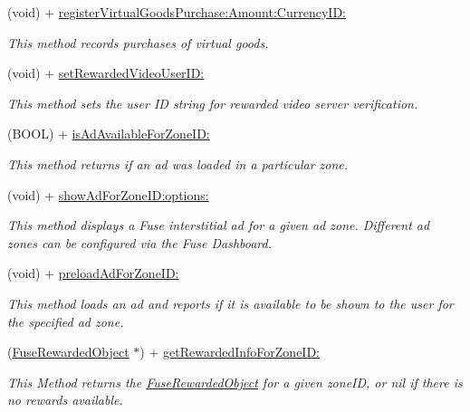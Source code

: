 \begin{DoxyCompactItemize}
(void) + \hyperlink{interface_fuse_s_d_k_abd1bc1b2e677978fb0e559cd9f7a72a9}{register\+Virtual\+Goods\+Purchase\+:\+Amount\+:\+Currency\+I\+D\+:}
\begin{DoxyCompactList}\small\item\em This method records purchases of virtual goods. \end{DoxyCompactList}\item 
(void) + \hyperlink{interface_fuse_s_d_k_a61579033e1c61be4ee4567c4ed159dd0}{set\+Rewarded\+Video\+User\+I\+D\+:}
\begin{DoxyCompactList}\small\item\em This method sets the user I\+D string for rewarded video server verification. \end{DoxyCompactList}\item 
(B\+O\+O\+L) + \hyperlink{interface_fuse_s_d_k_abdf624c4ef56ee1c7cac73b37dc4f5fd}{is\+Ad\+Available\+For\+Zone\+I\+D\+:}
\begin{DoxyCompactList}\small\item\em This method returns if an ad was loaded in a particular zone. \end{DoxyCompactList}\item 
(void) + \hyperlink{interface_fuse_s_d_k_aba0c488866771c47887ac847c2cd884e}{show\+Ad\+For\+Zone\+I\+D\+:options\+:}
\begin{DoxyCompactList}\small\item\em This method displays a Fuse interstitial ad for a given ad zone. Different ad zones can be configured via the Fuse Dashboard. \end{DoxyCompactList}\item 
(void) + \hyperlink{interface_fuse_s_d_k_a2e80d673366877a4bcfc6fe86031d526}{preload\+Ad\+For\+Zone\+I\+D\+:}
\begin{DoxyCompactList}\small\item\em This method loads an ad and reports if it is available to be shown to the user for the specified ad zone. \end{DoxyCompactList}\item 
(\hyperlink{interface_fuse_rewarded_object}{Fuse\+Rewarded\+Object} $\ast$) + \hyperlink{interface_fuse_s_d_k_a89958c6b87beffac157ac028e9e29df1}{get\+Rewarded\+Info\+For\+Zone\+I\+D\+:}
\begin{DoxyCompactList}\small\item\em This Method returns the \hyperlink{interface_fuse_rewarded_object}{Fuse\+Rewarded\+Object} for a given zone\+I\+D, or nil if there is no rewards available. \end{DoxyCompactList}\item 

\end{DoxyCompactItemize}
